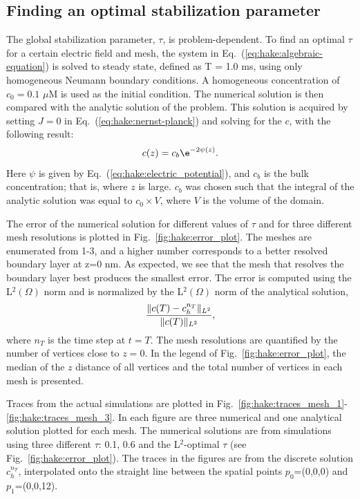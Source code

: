 \subsection{Finding an optimal stabilization parameter}
The global stabilization parameter, $\tau$, is problem-dependent. To
find an optimal $\tau$ for a certain electric field and mesh, the
system in Eq.~(\ref{eq:hake:algebraic-equation}) is solved to steady
state, defined as T = 1.0 ms, using only homogeneous Neumann boundary
conditions. A homogeneous concentration of $c_0=0.1$ $\mu$M is used as
the initial condition. The numerical solution is then compared with
the analytic solution of the problem. This solution is acquired by
setting $J=0$ in Eq.~(\ref{eq:hake:nernst-planck}) and solving for the
$c$, with the following result:
\begin{equation}
  \label{eq:hake:analytic-solution}
  c(z) = c_b\e^{-2\psi(z)}.
\end{equation}
Here $\psi$ is given by Eq.~(\ref{eq:hake:electric_potential}), and
$c_b$ is the bulk concentration; that is, where $z$ is large. $c_b$ was
chosen such that the integral of the analytic solution was equal to
$c_0\times V$, where $V$ is the volume of the domain.

The error of the numerical solution for different values of $\tau$ and
for three different mesh resolutions is plotted in
Fig.~\ref{fig:hake:error_plot}. The meshes are enumerated from 1-3,
and a higher number corresponds to a better resolved boundary layer at
z=0 nm. As expected, we see that the mesh that resolves the boundary
layer best produces the smallest error. The error is computed using
the L$^2(\Omega)$ norm and is normalized by the L$^2(\Omega)$ norm of
the analytical solution,
\begin{equation}
  \label{eq:hake:error_norm}
  \frac{\|c(T)-c_h^{n_T}\|_{L^2}}{\|c(T)\|_{L^2}},
\end{equation}
where $n_T$ is the time step at $t=T$. The mesh resolutions are
quantified by the number of vertices close to $z=0$. In the legend of
Fig.~\ref{fig:hake:error_plot}, the median of the $z$ distance of all
vertices and the total number of vertices in each mesh is presented.

Traces from the actual simulations are plotted in
Fig.~\ref{fig:hake:traces_mesh_1}-\ref{fig:hake:traces_mesh_3}. In
each figure are three numerical and one analytical solution plotted
for each mesh. The numerical solutions are from simulations using
three different $\tau$: 0.1, 0.6 and the L$^2$-optimal $\tau$ (see
Fig.~\ref{fig:hake:error_plot}). The traces in the figures are from
the discrete solution $c_h^{n_T}$, interpolated onto the straight line
between the spatial points $p_0$=(0,0,0) and $p_1$=(0,0,12).

